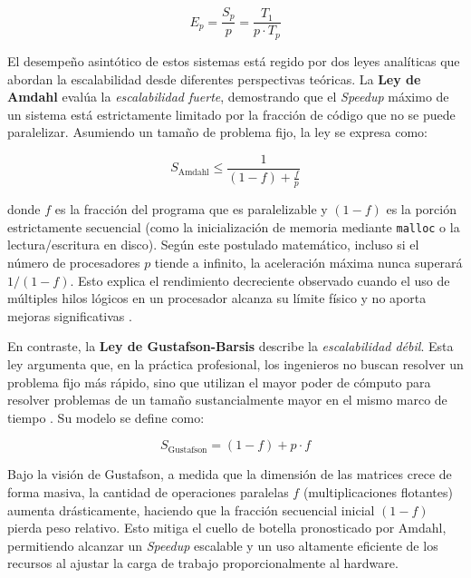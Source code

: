 \begin{equation}
    E_p = \frac{S_p}{p} = \frac{T_1}{p \cdot T_p}
\end{equation}

El desempeño asintótico de estos sistemas está regido por dos leyes analíticas que abordan la escalabilidad desde diferentes perspectivas teóricas. La \textbf{Ley de Amdahl} evalúa la \textit{escalabilidad fuerte}, demostrando que el \textit{Speedup} máximo de un sistema está estrictamente limitado por la fracción de código que no se puede paralelizar. Asumiendo un tamaño de problema fijo, la ley se expresa como:

\begin{equation}
    S_{\text{Amdahl}} \leq \frac{1}{(1 - f) + \frac{f}{p}}
\end{equation}

donde \(f\) es la fracción del programa que es paralelizable y \((1 - f)\) es la porción estrictamente secuencial (como la inicialización de memoria mediante \texttt{malloc} o la lectura/escritura en disco). Según este postulado matemático, incluso si el número de procesadores \(p\) tiende a infinito, la aceleración máxima nunca superará \(1 / (1 - f)\). Esto explica el rendimiento decreciente observado cuando el uso de múltiples hilos lógicos en un procesador alcanza su límite físico y no aporta mejoras significativas \parencite{Patterson2017Computer}.

En contraste, la \textbf{Ley de Gustafson-Barsis} describe la \textit{escalabilidad débil}. Esta ley argumenta que, en la práctica profesional, los ingenieros no buscan resolver un problema fijo más rápido, sino que utilizan el mayor poder de cómputo para resolver problemas de un tamaño sustancialmente mayor en el mismo marco de tiempo \parencite{Gustafson1988Reevaluating}. Su modelo se define como:

\begin{equation}
    S_{\text{Gustafson}} = (1 - f) + p \cdot f
\end{equation}

Bajo la visión de Gustafson, a medida que la dimensión de las matrices crece de forma masiva, la cantidad de operaciones paralelas \(f\) (multiplicaciones flotantes) aumenta drásticamente, haciendo que la fracción secuencial inicial \((1 - f)\) pierda peso relativo. Esto mitiga el cuello de botella pronosticado por Amdahl, permitiendo alcanzar un \textit{Speedup} escalable y un uso altamente eficiente de los recursos al ajustar la carga de trabajo proporcionalmente al hardware.

